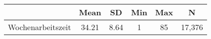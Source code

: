 {
\def\sym#1{\ifmmode^{#1}\else\(^{#1}\)\fi}
\begin{tabular}{l*{1}{ccccc}}
\toprule
                    &        Mean&          SD&         Min&         Max&           N\\
\midrule
Wochenarbeitszeit   &       34.21&        8.64&           1&          85&      17,376\\
\bottomrule
\end{tabular}
}
